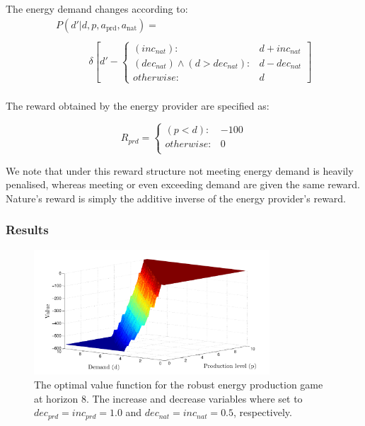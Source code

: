 The energy demand changes according to:
{\small 
\abovedisplayskip=15pt
\belowdisplayskip=0pt
\begin{align*}
&P(d' | d, p, a_{\text{prd}}, a_{\text{nat}}) = \\
\\
& \hspace{40pt}\delta \left[ d' - \begin{cases}
      (inc_{nat})  : & d + inc_{nat} \\
       (dec_{nat}) \wedge (d > dec_{nat}) : & d - dec_{nat} \\
      otherwise: & d
    \end{cases} \right] & \\    
\end{align*}
}%

The reward obtained by the energy provider are specified as:

{\small 
\abovedisplayshortskip=0pt
\belowdisplayshortskip=0pt
\begin{equation}
  R_{prd} = 
    \begin{cases}
      (p < d) : & -100 \\ 
      otherwise : & 0 \\ 
    \end{cases} \nonumber
\end{equation}
}%

We note that under this reward structure not meeting energy demand
is heavily penalised, whereas meeting or even exceeding demand are
given the same reward. Nature's reward is simply the additive inverse 
of the energy provider's reward.

\subsubsection{Results}


\begin{figure}[ht!]
\includegraphics[width=250pt]{sep.pdf}
\vspace{-3mm}
\caption{The optimal value function for the robust energy production game at horizon 8. 
The increase and decrease variables where set to $dec_{prd} = inc_{prd} = 1.0$ and $dec_{nat} = inc_{nat} = 0.5$, respectively.}
\label{fig:sepvfunc}
\end{figure}

